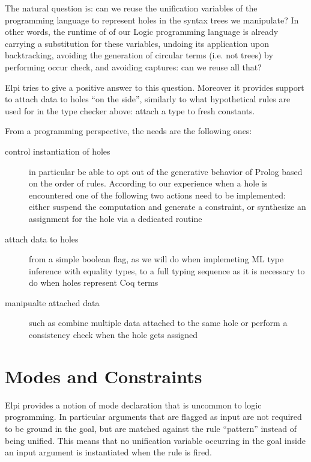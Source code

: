 \documentclass[a4paper, 11pt]{book}
\begin{document}
The natural question is: can we reuse the unification variables of
the programming language to represent holes in the syntax trees we manipulate?
In other words, the runtime of of our Logic programming language is already
carrying a substitution for these variables, undoing its application upon
backtracking, avoiding the generation of circular terms (i.e. not trees)
by performing occur check, and avoiding captures: can we reuse all that?

Elpi tries to give a positive answer to this question. Moreover it provides
support to attach data to holes ``on the side'', similarly to what
hypothetical rules are used for in the type checker above: attach a type
to fresh constants.

From a programming perspective, the needs are the following ones:

\begin{description}
  \item[control instantiation of holes] in particular be able to opt out of the
     generative behavior of Prolog based on the order of rules. According to
     our experience when a hole is encountered one of the following two
     actions need to be implemented: either suspend the computation and
     generate a constraint, or synthesize an assignment for the hole
     via a dedicated routine
  \item[attach data to holes] from a simple boolean flag, as we will do
    when implemeting ML type inference with equality types,
    to a full typing sequence as it is necessary to do when holes represent
    Coq terms

  \item[manipualte attached data] such as combine multiple data attached to the same
     hole or perform a consistency check when the hole gets assigned

\end{description}


\section{Modes and Constraints}

Elpi provides a notion of mode declaration that is uncommon to logic programming.
In particular arguments that are flagged as input are not required to be
ground in the goal, but are matched against the rule ``pattern'' instead 
of being unified. This means that no unification variable occurring in
the goal inside an input argument is instantiated when the rule is
fired.
\end{document}
